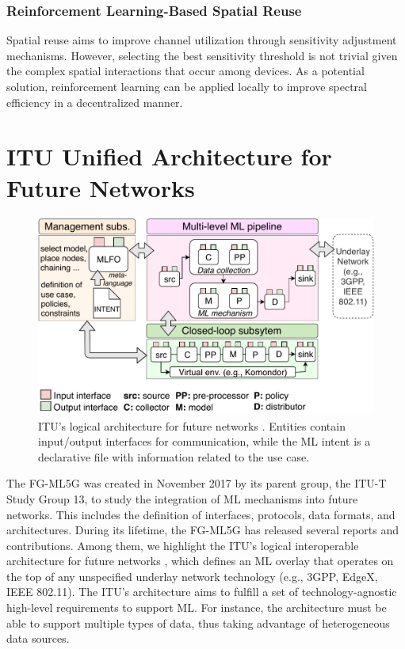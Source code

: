 \documentclass{article}
\begin{document}
\subsubsection{Reinforcement Learning-Based Spatial Reuse} 
Spatial reuse aims to improve channel utilization through sensitivity adjustment mechanisms. However, selecting the best sensitivity threshold is not trivial given the complex spatial interactions that occur among devices. As a potential solution, reinforcement learning can be applied locally to improve spectral efficiency in a decentralized manner.

\section{ITU Unified Architecture for Future Networks}
\label{section:itu_architecture}

\begin{figure}[!ht]
	\centering
	\includegraphics[width=.85\textwidth]{itu_ml_architecture}
	\caption{ITU's logical architecture for future networks \cite{itu2019architecture}. Entities contain input/output interfaces for communication, while the ML intent is a declarative file with information related to the use case.}
	\label{fig:itu_ml_architecture}
\end{figure}

The FG-ML5G was created in November 2017 by its parent group, the ITU-T Study Group 13, to study the integration of ML mechanisms into future networks. This includes the definition of interfaces, protocols, data formats, and architectures. During its lifetime, the FG-ML5G has released several reports and contributions. Among them, we highlight the ITU's logical interoperable architecture for future networks \cite{itu2019architecture}, which defines an ML overlay that operates on the top of any unspecified underlay network technology (e.g., 3GPP, EdgeX, IEEE 802.11). The ITU's architecture aims to fulfill a set of technology-agnostic high-level requirements to support ML. For instance, the architecture must be able to support multiple types of data, thus taking advantage of heterogeneous data sources. 
\end{document}
